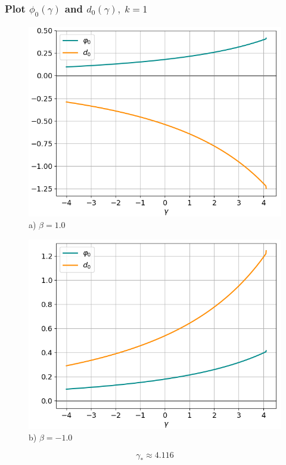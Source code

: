 \documentclass[fullscreen=true, unicode, bookmarks=false]{beamer}
\begin{document}
\begin{frame}
\frametitle{ Plot $ \phi_0(\gamma) $ and $ d_0(\gamma), \; k = 1 $ }

\begin{figure} 
\begin{minipage}[h]{0.49\linewidth}
\begin{center}
\includegraphics[scale=0.37]{oscillating_phi0d0_x0_000_beta_10.png} \\ {\scriptsize a) $ \beta = 1.0 $}
\end{center}
\end{minipage} 
\hfill
\begin{minipage}[h]{0.49\linewidth}
\begin{center}
\includegraphics[scale=0.37]{oscillating_phi0d0_x0_000_beta_-10.png}  \\ {\scriptsize b) $ \beta = -1.0 $}
\end{center}
\end{minipage} 
\end{figure}
$$ \gamma_* \approx 4.116 $$

\end{frame}
\end{document}
